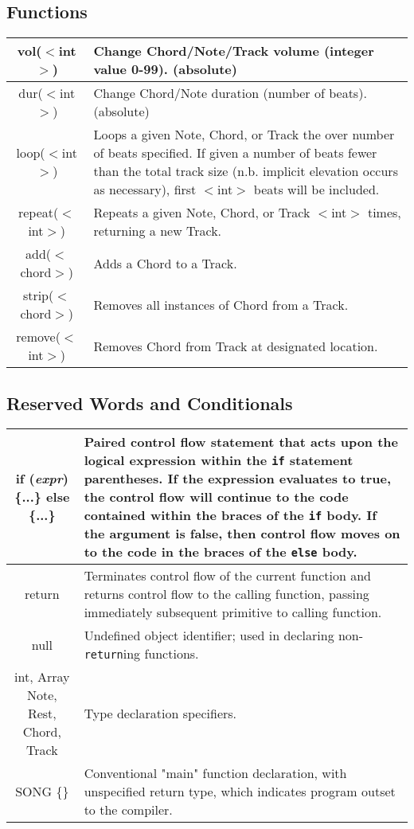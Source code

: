 \documentclass[letterpaper]{article}
\begin{document}
\begin{samepage}
\subsection{Functions}
\begin{table}[H]
\centering
\begin{tabularx}{.75\textwidth}{|c|X|}
\hline
vol($<$int$>$) & Change Chord/Note/Track volume (integer value 0-99). (absolute) \\
\hline
dur($<$int$>$) & Change Chord/Note duration (number of beats). (absolute) \\
\hline
loop($<$int$>$) & Loops a given Note, Chord, or Track the over number of beats specified. If given a number of beats fewer than the total track size (n.b. implicit elevation occurs as necessary), first $<$int$>$ beats will be included. \\
\hline
repeat($<$int$>$) & Repeats a given Note, Chord, or Track $<$int$>$ times, returning a new Track. \\
\hline
add($<$chord$>$) & Adds a Chord to a Track. \\
\hline
strip($<$chord$>$) & Removes all instances of Chord from a Track. \\
\hline
remove($<$int$>$) & Removes Chord from Track at designated location. \\
\hline
\end{tabularx}
\end{table}
\end{samepage}

\begin{samepage}
\subsection{Reserved Words and Conditionals}
\begin{table}[H]
\centering
\begin{tabularx}{.75\textwidth}{|c|X|}
\hline
if (\textit{expr}) \{...\} else \{...\}& Paired control flow statement that acts upon the logical expression within the \texttt{if} statement parentheses. If the expression evaluates to true, the control flow will continue to the code contained within the braces of the \texttt{if} body. If the argument is false, then control flow moves on to the code in the braces of the \texttt{else} body. \\
\hline
return & Terminates control flow of the current function and returns control flow to the calling function, passing immediately subsequent primitive to calling function.\\
\hline
null & Undefined object identifier; used in declaring non-\texttt{return}ing functions. \\
\hline
int, Array Note, Rest, Chord, Track & Type declaration specifiers.\\
\hline
SONG \{\} & Conventional "main" function declaration, with unspecified return type, which indicates program outset to the compiler.\\
\hline
\end{tabularx}
\end{table}
\end{samepage}
\end{document}
